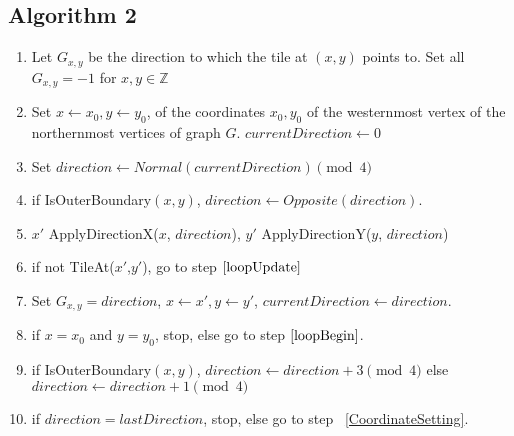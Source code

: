 \begin{enumerate}
\section{Algorithm 2}
\begin{enumerate}[\bf 1.]
\item Let $G_{x,y}$ be the direction to which the tile at $(x,y)$ points to. Set all $G_{x,y}=-1$ for $x,y \in \mathbb{Z}$
\item Set $x\gets x_0, y\gets y_0$, of the coordinates $x_0,y_0$ of the westernmost vertex of the northernmost vertices of graph $G$. $currentDirection\gets 0$
\item \label{loopBegin} Set $direction \gets Normal(currentDirection) \pmod{4}$
\item if IsOuterBoundary$(x,y)$, $direction \gets Opposite(direction)$.
\item \label{CoordinateSetting} $x'$ \gets ApplyDirectionX($x$, $direction$), $y'$ \gets ApplyDirectionY($y$, $direction$)
\item if not TileAt($x'$,$y'$), go to step $\ref{loopUpdate}$
\item Set $G_{x,y} = direction$, $x \gets x', y \gets y'$, $currentDirection \gets direction$.
\item if $x=x_0$ and $y=y_0$, stop, else go to step $\ref{loopBegin}$.
\item \label{loopUpdate} if IsOuterBoundary$(x,y)$, $direction\gets direction+3\pmod{4}$ else $direction \gets direction+1 \pmod{4}$
\item if $direction = lastDirection$, stop, else go to step ~\ref{CoordinateSetting}.
\end{enumerate}
\end{enumerate}